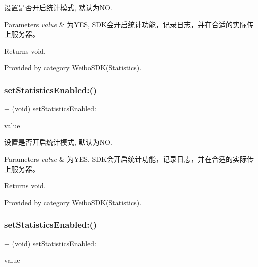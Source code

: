 设置是否开启统计模式, 默认为\+NO. 
\begin{DoxyParams}{Parameters}
{\em value} & 为\+Y\+ES, S\+D\+K会开启统计功能，记录日志，并在合适的实际传上服务器。 \\
\hline
\end{DoxyParams}
\begin{DoxyReturn}{Returns}
void. 
\end{DoxyReturn}


Provided by category \mbox{\hyperlink{category_weibo_s_d_k_07_statistics_08_a0b32ee3e2b30059b93e7dea204b43818}{Weibo\+S\+D\+K(\+Statistics)}}.

\mbox{\label{interface_weibo_s_d_k_a0b32ee3e2b30059b93e7dea204b43818}} 
\subsubsection{\texorpdfstring{set\+Statistics\+Enabled\+:()}{setStatisticsEnabled:()}\hspace{0.1cm}{\footnotesize\ttfamily [2/3]}}
{\footnotesize\ttfamily + (void) set\+Statistics\+Enabled\+: \begin{DoxyParamCaption}\item[{(B\+O\+OL)}]{value }\end{DoxyParamCaption}}

设置是否开启统计模式, 默认为\+NO. 
\begin{DoxyParams}{Parameters}
{\em value} & 为\+Y\+ES, S\+D\+K会开启统计功能，记录日志，并在合适的实际传上服务器。 \\
\hline
\end{DoxyParams}
\begin{DoxyReturn}{Returns}
void. 
\end{DoxyReturn}


Provided by category \mbox{\hyperlink{category_weibo_s_d_k_07_statistics_08_a0b32ee3e2b30059b93e7dea204b43818}{Weibo\+S\+D\+K(\+Statistics)}}.

\mbox{\label{interface_weibo_s_d_k_a0b32ee3e2b30059b93e7dea204b43818}} 
\subsubsection{\texorpdfstring{set\+Statistics\+Enabled\+:()}{setStatisticsEnabled:()}\hspace{0.1cm}{\footnotesize\ttfamily [3/3]}}
{\footnotesize\ttfamily + (void) set\+Statistics\+Enabled\+: \begin{DoxyParamCaption}\item[{(B\+O\+OL)}]{value }\end{DoxyParamCaption}}

